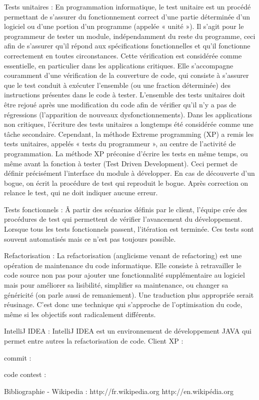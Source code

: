 \documentclass{article}
\begin{document}
Tests unitaires : En programmation informatique, le test unitaire est un procédé permettant de s'assurer du fonctionnement correct d'une partie déterminée d'un logiciel ou d'une portion d'un programme (appelée « unité »).
Il s'agit pour le programmeur de tester un module, indépendamment du reste du programme, ceci afin de s'assurer qu'il répond aux spécifications fonctionnelles et qu'il fonctionne correctement en toutes circonstances. Cette vérification est considérée comme essentielle, en particulier dans les applications critiques. Elle s'accompagne couramment d'une vérification de la couverture de code, qui consiste à s'assurer que le test conduit à exécuter l'ensemble (ou une fraction déterminée) des instructions présentes dans le code à tester.
L'ensemble des tests unitaires doit être rejoué après une modification du code afin de vérifier qu'il n'y a pas de régressions (l'apparition de nouveaux dysfonctionnements).
Dans les applications non critiques, l'écriture des tests unitaires a longtemps été considérée comme une t\^ache secondaire. Cependant, la méthode Extreme programming (XP) a remis les tests unitaires, appelés « tests du programmeur », au centre de l'activité de programmation.
La méthode XP préconise d'écrire les tests en même temps, ou même avant la fonction à tester (Test Driven Development). Ceci permet de définir précisément l'interface du module à développer. En cas de découverte d'un bogue, on écrit la procédure de test qui reproduit le bogue. Après correction on relance le test, qui ne doit indiquer aucune erreur.

Tests fonctionnels : \^A partir des scénarios définis par le client, l'équipe crée des procédures de test qui permettent de vérifier l'avancement du développement. Lorsque tous les tests fonctionnels passent, l'itération est terminée. Ces tests sont souvent automatisés mais ce n'est pas toujours possible. 

Refactorisation : La refactorisation (anglicisme venant de refactoring) est une opération de maintenance du code informatique. Elle consiste à retravailler le code source non pas pour ajouter une fonctionnalité supplémentaire au logiciel mais pour améliorer sa lisibilité, simplifier sa maintenance, ou changer sa généricité (on parle aussi de remaniement). Une traduction plus appropriée serait réusinage. C'est donc une technique qui s'approche de l'optimisation du code, même si les objectifs sont radicalement différents. 

IntelliJ IDEA : IntelliJ IDEA est un environnement de développement JAVA qui permet entre autres la refactorisation de code.
Client XP : 

commit : 

code contest :



Bibliographie
- Wikipedia : 
http://fr.wikipedia.org
http://en.wikipédia.org
\end{document}
